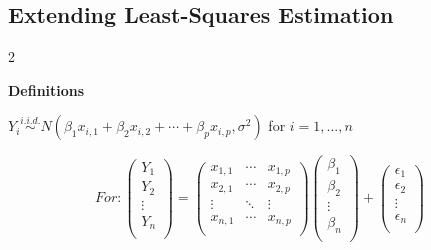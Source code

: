 \documentclass[9pt]{article}
\begin{document}
    \subsection{Extending Least-Squares Estimation}

    \vspace{-0.4cm}
    \begin{multicols}{2}

        \begin{center}
            \small \textbf{Definitions}
        \end{center}
        \vspace{-0.2cm}

        $Y_i \stackrel{i.i.d.}{\sim}N(\beta_1x_{i,1}+\beta_2x_{i,2}+\cdots+\beta_px_{i,p},\sigma^2)$ for $i=1,...,n$

        \vspace{-0.9cm}
        \begin{center}
            \[
                For:
                \begin{pmatrix}
                    Y_1    \\
                    Y_2    \\
                    \vdots \\
                    Y_n    \\
                \end{pmatrix}
                =
                \begin{pmatrix}
                    x_{1,1} & \cdots & x_{1,p} \\
                    x_{2,1} & \cdots & x_{2,p} \\
                    \vdots  & \ddots & \vdots  \\
                    x_{n,1} & \cdots & x_{n,p} \\
                \end{pmatrix}
                \begin{pmatrix}
                    \beta_1 \\
                    \beta_2 \\
                    \vdots  \\
                    \beta_n \\
                \end{pmatrix}
                +
                \begin{pmatrix}
                    \epsilon_1 \\
                    \epsilon_2 \\
                    \vdots     \\
                    \epsilon_n \\
                \end{pmatrix}
            \]
        \end{center}
        \vspace{-0.1cm}


\end{multicols}
\end{document}
